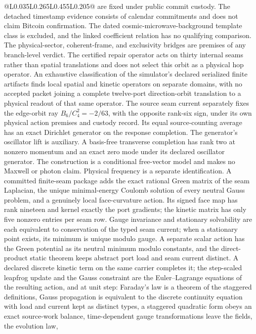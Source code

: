 \documentclass[10pt]{article}
\begin{document}
\begin{center}
\begin{longtable}{@{}L{0.035\linewidth}L{0.265\linewidth}L{0.455\linewidth}L{0.205\linewidth}@{}}
are fixed under public commit custody. The detached timestamp evidence consists
of calendar commitments and does not claim Bitcoin confirmation. The dated cosmic-microwave-background template
class is excluded, and the linked coefficient relation has no
qualifying comparison. The physical-sector, coherent-frame, and exclusivity
bridges are premises of any branch-level verdict. The certified repair
operator acts on thirty internal seams rather than spatial translations and
does not select this orbit as a physical hop operator. An exhaustive
classification of the simulator's declared serialized finite artifacts finds
local spatial and kinetic operators
on separate domains, with no accepted packet joining a complete
twelve-port direction-orbit translation to a physical readout of that same
operator. The source seam current separately fixes the edge-orbit ray
\(B_6/C_4^2=-2/63\), with the opposite rank-six sign, under its own physical
action premises and custody record. Its equal source-counting average has an
exact Dirichlet generator on the response completion. The generator's
oscillator lift is auxiliary. A basis-free transverse completion has rank two
at nonzero momentum and an exact zero mode under its declared oscillator
generator. The construction is a conditional free-vector model and makes no
Maxwell or photon claim. Physical frequency is a separate identification.
A committed finite-seam package adds the exact rational Green matrix
of the seam Laplacian, the unique minimal-energy Coulomb solution of every
neutral Gauss problem, and a genuinely local face-curvature action. Its
signed face map has rank nineteen and kernel exactly the port gradients; the
kinetic matrix has only five nonzero entries per seam row. Gauge invariance
and stationary solvability are each equivalent to conservation of the typed
seam current; when a stationary point exists, its minimum is unique modulo
gauge. A separate scalar
action has the Green potential as its neutral minimum modulo constants, and
the direct-product static theorem keeps abstract port load and seam current distinct.
A declared discrete kinetic term on the same carrier completes it; the
step-scaled leapfrog update and the Gauss constraint are the Euler--Lagrange
equations of the resulting action, and at unit step:
Faraday's law is a theorem of the staggered definitions, Gauss propagation is
equivalent to the discrete continuity equation with load and current kept as
distinct types, a staggered quadratic form obeys an exact source-work balance,
time-dependent gauge transformations leave the fields, the evolution law,

\end{longtable}
\end{center}
\end{document}
